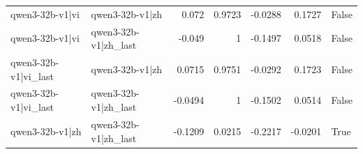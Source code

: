 \begin{table}
\begin{tabular}{l l r r r r l}
qwen3-32b-v1|vi & qwen3-32b-v1|zh & 0.072 & 0.9723 & -0.0288 & 0.1727 & False \\
qwen3-32b-v1|vi & qwen3-32b-v1|zh_last & -0.049 & 1 & -0.1497 & 0.0518 & False \\
qwen3-32b-v1|vi_last & qwen3-32b-v1|zh & 0.0715 & 0.9751 & -0.0292 & 0.1723 & False \\
qwen3-32b-v1|vi_last & qwen3-32b-v1|zh_last & -0.0494 & 1 & -0.1502 & 0.0514 & False \\
qwen3-32b-v1|zh & qwen3-32b-v1|zh_last & -0.1209 & 0.0215 & -0.2217 & -0.0201 & True \\
\bottomrule
\end{tabular}
\end{table}
